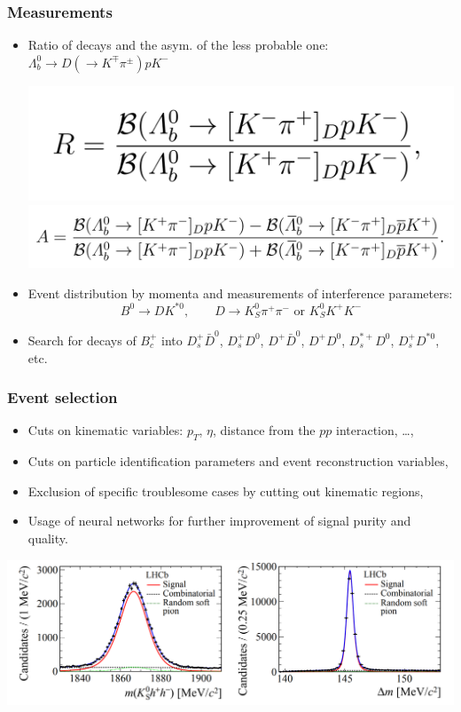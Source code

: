 \documentclass[10pt, aspectratio=169]{beamer}
\def\Lb{{\Lambda_b^0}}
\def\pip{{\pi^+}}
\def\pim{{\pi^-}}
\def\Kp{{K^+}}
\def\Km{{K^-}}
\def\Kshort{{K_S^0}}
\def\Kstarz{{K^{*0}}{}}
\def\p{{p}}
\begin{document}
\begin{frame}[label=analyses]%
  \frametitle{Measurements}
  \centering
  \begin{itemize}
    \item Ratio of decays and the asym. of the less probable one:
      $\Lb\to D(\to K^\mp\pi^\pm)\p\Km$
      \parbox{1\linewidth}{
        \centering
        \includegraphics[width=.3\linewidth]{figures/lect/Lb2DpK-ratio} \\
        \includegraphics[width=.6\linewidth]{figures/lect/Lb2DpK-asym}
      }

    \item Event distribution by momenta and measurements of interference 
      parameters: \large
      \[ B^0 \to D \Kstarz, \qquad
      D \to \Kshort\pip\pim \text{ or } \Kshort\Kp\Km\]
      \normalsize

    \item Search for decays of $B_c^+$ into
      $D_s^{+}\bar{D}^{0}$,
      $D_s^{+}{D}^{0}$,
      $D^{+}\bar{D}^{0}$,
      $D^{+}{D}^{0}$,
      $D_s^{*+}{D}^{0}$,
      $D_s^{+}{D}^{*0}$, etc.
  \end{itemize}
\end{frame}%

\begin{frame}[label=selection]%
  \frametitle{Event selection}

  \begin{itemize}
    \item Cuts on kinematic variables:
      $p_T$, $\eta$, distance from the $pp$ interaction, \ldots,
    \item Cuts on particle identification parameters and event 
      reconstruction variables,
    \item Exclusion of specific troublesome cases by cutting out 
      kinematic regions,
    \item Usage of neural networks for further improvement of signal 
      purity and quality.
  \end{itemize}

  \centering \vfill
  \includegraphics[width=.8\linewidth]{figures/lect/B2DKstar-pointless}
\end{frame}%
\end{document}
